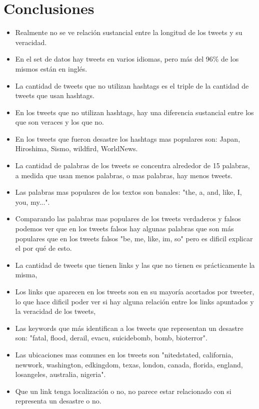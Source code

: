 \documentclass[titlepage,a4paper]{article}
\begin{document}
\section{\Large Conclusiones}
\begin{itemize}
  \item Realmente no se ve relación sustancial entre la longitud de los tweets y su veracidad.
  \item En el set de datos hay tweets en varios idiomas, pero más del 96\% de los mismos están en inglés.
  \item La cantidad de tweets que no utilizan hashtags es el triple de la cantidad de tweets que usan hashtags.	
  \item En los tweets que no utilizan hashtags, hay una diferencia sustancial entre los que son veraces y los que no.
  \item En los tweets que fueron desastre los hashtags mas populares son: Japan, Hiroshima, Sismo, wildfird, WorldNews.
  \item La cantidad de palabras de los tweets se concentra alrededor de 15 palabras, a medida que usan menos palabras, o mas palabras, hay menos tweets.
  \item Las palabras mas populares de los textos son banales: "the, a, and, like, I, you, my...".
  \item Comparando las palabras mas populares de los tweets verdaderos y falsos podemos ver que en los tweets falsos hay algunas palabras que son más populares que en los tweets falsos "be, me, like, im, so" pero es dificil explicar el por qué de esto.
  \item La cantidad de tweets que tienen links y las que no tienen es prácticamente la misma,
  \item Los links que aparecen en los tweets son en su mayoría acortados por tweeter, lo que hace dificil poder ver si hay alguna relación entre los links apuntados y la veracidad de los tweets,
  \item Las keywords que más identifican a los tweets que representan un desastre son: "fatal, flood, derail, evacu, suicidebomb, bomb, bioterror".
  \item Las ubicaciones mas comunes en los tweets son "nitedstated, california, newwork, washington, edkingdom, texas, london, canada, florida, england, losangeles, australia, nigeria".
  \item Que un link tenga localización o no, no parece estar relacionado con si representa un desastre o no.
\end{itemize}
\end{document}
